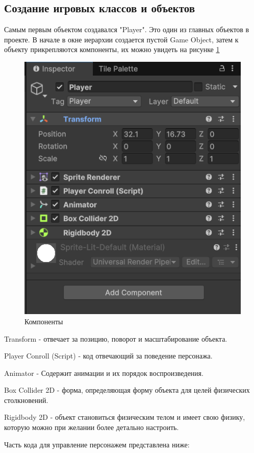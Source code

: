 \documentclass[bachelor, och, coursework, times]{SCWorks}
\begin{document}
    \subsection{Создание игровых классов и объектов}

    Самым первым объектом создавался "Player". Это один из главных объектов в проекте.
    В начале в окне иерархии создается пустой Game Object, затем к объекту прикрепляются компоненты, их можно 
    увидеть на рисунке \ref{fig:Comp}

     \begin{figure} [H]
        \centering
    \includegraphics[width=0.50\linewidth]{Pictures/Снимок экрана 2025-06-24 222030.png}
    \caption{Компоненты}
    \label{fig:Comp}
    \end{figure}

    Transform - отвечает за позицию, поворот и масштабирование объекта.

    Player Conroll (Script) - код отвечающий за поведение персонажа.

    Animator - Содержит анимации и их порядок воспроизведения.

    Box Collider 2D - форма, определяющая форму объекта для целей физических столкновений.

    Rigidbody 2D - объект становиться физическим телом и имеет свою физику, которую можно
    при желании более детально настроить.

    Часть кода для управление персонажем представлена ниже:
    
\end{document}
